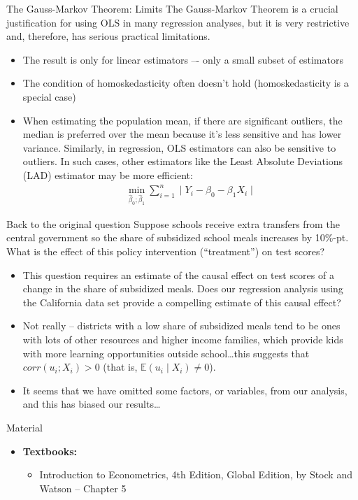 \documentclass[notes,10pt, aspectratio=169]{beamer}
\begin{document}
\begin{frame}{The Gauss-Markov Theorem: Limits}
The Gauss-Markov Theorem is a crucial justification for using OLS in many regression analyses, but it is very restrictive and, therefore, has serious practical limitations.
\begin{itemize}
    \item The result is only for linear estimators –- only a small subset of estimators
    \item The condition of homoskedasticity often doesn’t hold (homoskedasticity is a special case)
    \item When estimating the population mean, if there are significant outliers, the median is preferred over the mean because it's less sensitive and has lower variance. Similarly, in regression, OLS estimators can also be sensitive to outliers. In such cases, other estimators like the Least Absolute Deviations (LAD) estimator may be more efficient:
    \begin{eqnarray*}
        \min_{\hat{\beta}_0;\hat{\beta}_1}\sum_{i=1}^n \mid Y_i - \beta_0 - \beta_1 X_i \mid 
    \end{eqnarray*}
\end{itemize}
\end{frame}


\begin{frame}{Back to the original question}
Suppose schools receive extra transfers from the central government so the share of subsidized school meals increases by 10\%-pt. What is the effect of this policy intervention (“treatment”) on test scores? 
\begin{itemize}
    \item This question requires an estimate of the causal effect on test scores of a change in the share of subsidized meals. Does our regression analysis using the California data set provide a compelling estimate of this causal effect?
    \item Not really – districts with a low share of subsidized meals tend to be ones with lots of other resources and higher income families, which provide kids with more learning opportunities outside school…this suggests that $corr(u_i; X_i)>0$ (that is, $\mathbb{E}(u_i\mid X_i)\neq 0$).
    \item It seems that we have omitted some factors, or variables, from our analysis, and this has biased our results…
\end{itemize}
\end{frame}


\begin{frame}[allowframebreaks]{Material}
\begin{itemize}
    \item[--] \textbf{Textbooks:}
    \begin{itemize}
        \item Introduction to Econometrics, 4th Edition, Global Edition, by Stock and Watson -- Chapter 5
    \end{itemize}
\end{itemize}
\end{frame}
\end{document}
